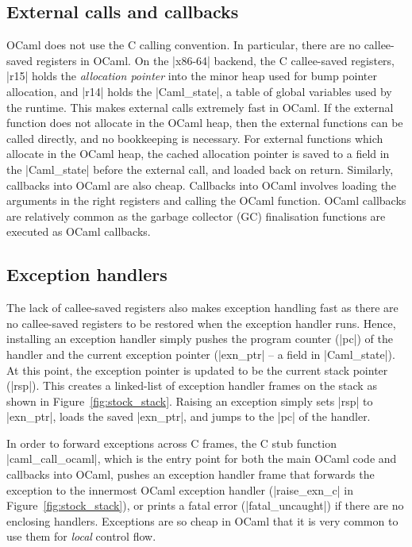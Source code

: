 \documentclass[sigplan,10pt,review,anonymous]{acmart}\settopmatter{printfolios=true,printccs=false,printacmref=false}
\begin{document}
\subsection{External calls and callbacks}
\label{sec:external}

OCaml does not use the C calling convention. In particular, there are no
callee-saved registers in OCaml. On the |x86-64| backend, the C callee-saved
registers, |r15| holds the \emph{allocation pointer} into the minor heap used
for bump pointer allocation, and |r14| holds the |Caml_state|, a table of
global variables used by the runtime. This makes external calls extremely fast
in OCaml. If the external function does not allocate in the OCaml heap, then
the external functions can be called directly, and no bookkeeping is necessary.
For external functions which allocate in the OCaml heap, the cached allocation
pointer is saved to a field in the |Caml_state| before the external call, and
loaded back on return. Similarly, callbacks into OCaml are also cheap.
Callbacks into OCaml involves loading the arguments in the right registers and
calling the OCaml function. OCaml callbacks are relatively common as the
garbage collector (GC) finalisation functions are executed as OCaml callbacks.

\subsection{Exception handlers}
\label{sec:exn_handlers}

The lack of callee-saved registers also makes exception handling fast as there
are no callee-saved registers to be restored when the exception handler runs.
Hence, installing an exception handler simply pushes the program counter (|pc|)
of the handler and the current exception pointer (|exn_ptr| -- a field in
|Caml_state|). At this point, the exception pointer is updated to be the
current stack pointer (|rsp|). This creates a linked-list of exception handler
frames on the stack as shown in Figure~\ref{fig:stock_stack}. Raising an
exception simply sets |rsp| to |exn_ptr|, loads the saved |exn_ptr|, and jumps
to the |pc| of the handler.


In order to forward exceptions across C frames, the C stub function
|caml_call_ocaml|, which is the entry point for both the main OCaml code and
callbacks into OCaml, pushes an exception handler frame that forwards the
exception to the innermost OCaml exception handler (|raise_exn_c| in
Figure~\ref{fig:stock_stack}), or prints a fatal error (|fatal_uncaught|) if
there are no enclosing handlers. Exceptions are so cheap in OCaml that it is
very common to use them for \emph{local} control flow.
\end{document}
